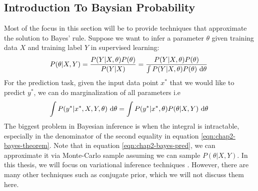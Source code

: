 \label{sec:chap2-prob-ml}

\subsection{Introduction To Baysian Probability}
\label{sec:chap2-intro-baysian}
Most of the focus in this section will be to provide techniques that approximate the solution to Bayes' rule. Suppose we want to infer a parameter $\theta$ given training data $X$ and training label $Y$ in supervised learning: 
\begin{equation}
    \label{eqn:chap2-bayes-theorem}
    P(\theta | X, Y) = \frac{P(Y | X, \theta) P(\theta)}{P(Y | X)} = \frac{P(Y | X, \theta) P(\theta)}{\int P(Y | X, \theta) P(\theta ) \ \mathrm{d} \theta}
\end{equation}
For the prediction task, given the input data point $x^*$ that we would like to predict $y^*$, we can do marginalization of all parameters i.e
\begin{equation}
    \label{eqn:chap2-bayes-pred}
    \int P(y^* | x^*, X, Y, \theta) \ \mathrm{d}\theta = \int P(y^* | x^*, \theta) P(\theta | X, Y) \ \mathrm{d}\theta
\end{equation}
The biggest problem in Bayesian inference is when the integral is intractable, especially in the denominator of the second equality in equation \ref{eqn:chap2-bayes-theorem}. Note that in equation \ref{eqn:chap2-bayes-pred}, we can approximate it via Monte-Carlo sample assuming we can sample $P(\theta | X, Y)$. In this thesis, we will focus on variational inference techniques \cite{jordan1999introduction}. However, there are many other techniques such as conjugate prior, which we will not discuss them here.

